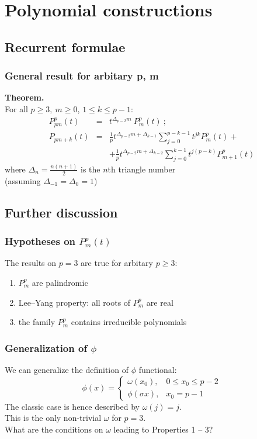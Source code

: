 \section{Polynomial constructions}


\subsection{Recurrent formulae}


\begin{frame}
    \frametitle{General result for arbitary p, m}
     {\bf Theorem.}\\ \bigskip
     For all $p \ge 3,\ m \ge 0$, $1 \le k \le p-1$:
     \bigskip 
     \begin{eqnarray*} 
     P_{pm}^p(t) & = &  t^{\Delta_{p-2} m}\ P_m^p(t)\ ; \\
     P_{pm+k}(t) & = &  \frac{1}{p} t^{\Delta_{p-2} m + \Delta_{k-1}}\sum\limits_{j=0}^{p-k-1} t^{jk} P_m^p(t) + \\
     & & + \frac{1}{p} t^{\Delta_{p-2} m + \Delta_{k-2}}\sum\limits_{j=0}^{k-1} t^{j(p-k)} P_{m+1}^p(t) 
      \end{eqnarray*}
     where $\Delta_n = \frac{n(n+1)}{2}$ is the $n$th triangle number\\
     (assuming $\Delta_{-1}=\Delta_0 = 1$)
\end{frame}


\subsection{Further discussion}

\begin{frame}
    \frametitle{Hypotheses on $P_m^p(t)$}
     The results on $p=3$ are true for arbitary $p \ge 3$:
  \begin{enumerate}
   \item $P_m^p$ are palindromic
   \item Lee--Yang property: all roots of $P_m^p$ are real
   \item the family $P_m^p$ contains irreducible polynomials
  \end{enumerate}
\end{frame}


\begin{frame}
    \frametitle{Generalization of $\phi$}
    We can generalize the definition of $\phi$ functional:
    $$
    \phi(x) = \begin{cases}
                    \omega(x_0), & 0 \le x_0 \le p - 2 \\
                    \phi(\sigma x), & x_0 = p - 1
                \end{cases}
    $$
    The classic case is hence described by $\omega(j)=j$.\\
    This is the only non-trivial $\omega$ for $p=3$.\\
    What are the conditions on $\omega$ leading to Properties 1 -- 3?
\end{frame}